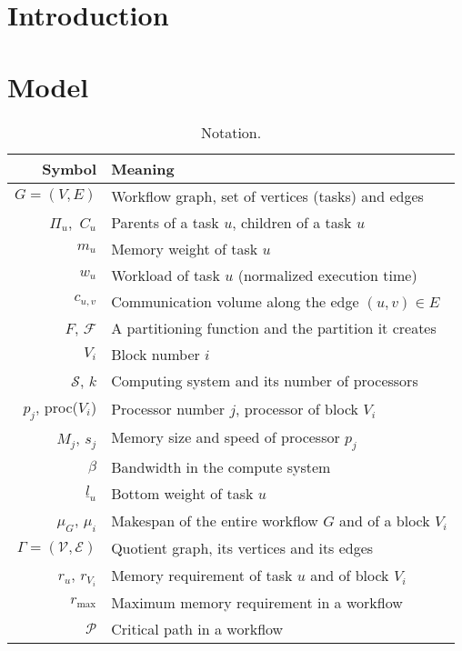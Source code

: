\documentclass[sigconf,review,anonymous]{acmart}
\newcommand{\bottomlevel}[1]{\underline{l}_{#1}} %
\newcommand{\criticalpath}{\mathcal{P}}
\newcommand{\parents}[1]{\,\Pi_{#1}}
\newcommand{\children}[1]{\,C_{#1}}
\newcommand{\cluster}{\,\mathcal{S}}
\begin{document}
    \section{Introduction}


    \section{Model}

    \begin{table}[h]
        \begin{center}
            \begin{tabular}{rl}
                \hline
                \textbf{Symbol} & \textbf{Meaning}  \\
                \hline
                $G = (V, E)$  & Workflow graph, set of vertices (tasks) and edges  \\
                $\parents{u}$, $\children{u}$ & Parents of a task $u$, children of a task $u$ \\
                $m_u$& Memory weight of task $u$ \\
                $w_u$   & Workload of  task $u$  (normalized execution time)    \\
                $c_{u,v}$   & Communication volume along the edge $(u,v)\in E$ \\
                $F$, $\mathcal{F}$ & A partitioning function and the partition it creates \\
                $V_i$ & Block number $i$\\ %
                $\cluster$, $k$   & Computing system and its number of processors   \\
                $p_j$, proc($V_i$)  & Processor number $j$, processor of block $V_i$ \\
                $M_j$, $s_j$   & Memory size and speed of processor $p_j$   \\
                $\beta$ & Bandwidth in the compute system  \\
                $\bottomlevel{u}$   & Bottom weight of task $u$   \\
                $\mu_G$, $\mu_i$ & Makespan of the entire workflow $G$ and of a block $V_i$ \\
                $\Gamma = (\mathcal{V}, \mathcal{E})$ & Quotient graph, its vertices and its edges  \\
                $r_u$, $r_{V_i}$  & Memory requirement of  task $u$ and of block $V_i$   \\
                $r_{\max}$   & Maximum memory requirement in a workflow   \\
                $\criticalpath$ & Critical path in a workflow  \\
                \hline
            \end{tabular}
        \end{center}
        \caption{Notation.} \label{tabnotation}
    \end{table}
\end{document}
